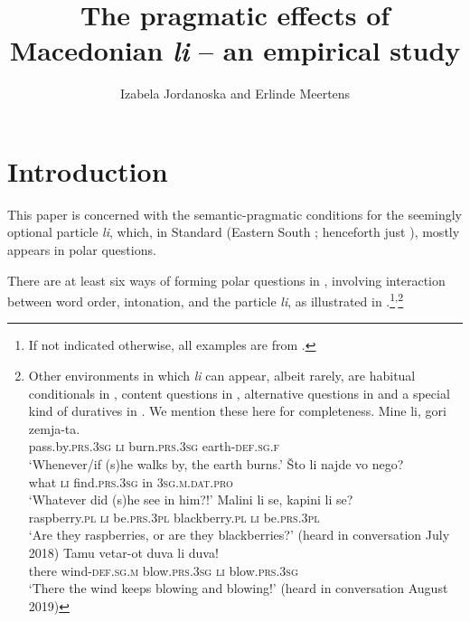 \documentclass[output=paper,
colorlinks,
citecolor=brown,
newtxmath
]{langscibook}
\author{Izabela Jordanoska\affiliation{University of Vienna} and Erlinde Meertens\affiliation{University of Konstanz}}
\title{The pragmatic effects of Macedonian \textit{li} -- an empirical study}
\begin{document}
\maketitle


\section{Introduction}

This paper is concerned with the semantic-pragmatic conditions for the seemingly optional particle \textit{li}, which, in Standard  (Eastern South ; henceforth just ), mostly appears in polar questions.

There are at least six ways of forming polar questions in , involving interaction between word order, intonation, and the particle \textit{li}, as illustrated in .\footnote{If not indicated otherwise, all examples are from .}\textsuperscript{,}\footnote{Other environments in which \textit{li} can appear, albeit rarely, are habitual conditionals in , content questions in , alternative questions in  and a special kind of duratives in . We mention these here for completeness.
\ea
\ea \gll Mine li, gori zemja-ta.\\
    pass.by.\textsc{prs.3sg} \textsc{li} burn.\textsc{prs.3sg} earth-\textsc{def.sg.f}\\
    \glt `Whenever/if (s)he walks by, the earth burns.' \label{cond} \hfill  \citep[539]{koneski1987}
        \ex \gll Što li najde vo nego? \\
what \textsc{li} find.\textsc{prs.3sg} in \textsc{3sg.m.dat.pro} \\
\glt `Whatever did (s)he see in him?!' \label{sto} \hfill  \citep[561]{Rudin.Kramer.Billings.Baerman1999}
        \ex  \gll Malini li se, kapini li se? \\
raspberry.\textsc{pl} \textsc{li} be.\textsc{prs.3pl} blackberry.\textsc{pl} \textsc{li} be.\textsc{prs.3pl} \\
\glt `Are they raspberries, or are they blackberries?' \label{altq}  \hfill  (heard in conversation July 2018)
        \ex \gll Tamu vetar-ot duva li duva! \\
there wind-\textsc{def.sg.m} blow.\textsc{prs.3sg} \textsc{li} blow.\textsc{prs.3sg} \\ \glt
`There the wind keeps blowing and blowing!'  \label{dur} \hfill (heard in conversation August 2019)

\z\z}
\end{document}
